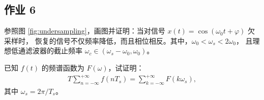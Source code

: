 \subsection{作业 6}

\begin{homework}
    参照图 \ref{fig:undersampling}，画图并证明：当对信号 $x(t) = \cos(\omega_0 t + \varphi)$ 欠采样时，
    恢复的信号不仅频率降低，而且相位相反。其中，$\omega_0 < \omega_s < 2\omega_0$，
    且理想低通滤波器的截止频率 $\omega_c \in (\omega_s - \omega_0, \omega_0)$。
\end{homework}

\begin{homework}
    已知 $f(t)$ 的频谱函数为 $F(\omega)$，试证明：
    \begin{align*}
        T \sum_{n = -\infty}^{+\infty}f(nT_s) = \sum_{k = -\infty}^{+\infty}F(k\omega_s),
    \end{align*}
    其中 $\omega_s = 2\pi / T_s$。
\end{homework}
